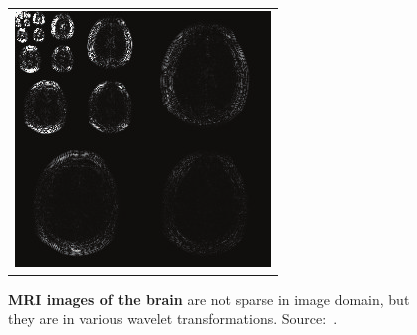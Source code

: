 \begin{figure}
\begin{minipage}[t]{0.31\linewidth}
\begin{tabular}{c}
            \\ 
            \includegraphics[width=0.65\linewidth]{images/brain_MRI_wavelet.png}
        \end{tabular}
        \caption{\textbf{MRI images of the brain} are not sparse in image domain, but they are in various wavelet transformations. Source:~\cite{zhao_compressed_2014}.}
        \label{fig:brain_wavelet}
    \end{minipage}
\end{figure}

